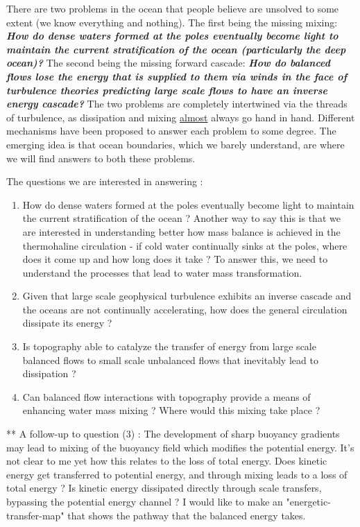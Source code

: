 \documentclass[12pt]{workjournal}
\begin{document}
There are two problems in the ocean that people believe are unsolved to some extent (we know everything and nothing). The first being the missing mixing: \textit{\textbf{How do dense waters formed at the poles eventually become light to maintain the current stratification of the ocean (particularly the deep ocean)?}} The second being the missing forward cascade: \textit{\textbf{How do balanced flows lose the energy that is supplied to them via winds in the face of turbulence theories predicting large scale flows to have an inverse energy cascade?}} The two problems are completely intertwined via the threads of turbulence, as dissipation and mixing \underline{almost} always go hand in hand. Different mechanisms have been proposed to answer each problem to some degree. The emerging idea is that ocean boundaries, which we barely understand, are where we will find answers to both these problems.


The questions we are interested in answering :
\begin{enumerate}
\item How do dense waters formed at the poles eventually become light to maintain the current stratification of the ocean ? Another way to say this is that we are interested in understanding better how mass balance is achieved in the thermohaline circulation - if cold water continually sinks at the poles, where does it come up and how long does it take ? To answer this, we need to understand the processes that lead to water mass transformation.
\item  Given that large scale geophysical turbulence exhibits an inverse cascade and the oceans are not continually accelerating, how does the general circulation dissipate its energy ?
\item Is topography able to catalyze the transfer of energy from large scale balanced flows to small scale unbalanced flows that inevitably lead to dissipation ?
\item Can balanced flow interactions with topography provide a means of enhancing water mass mixing ? Where would this mixing take place ?
\end{enumerate}
** A follow-up to question (3) : The development of sharp buoyancy gradients may lead to mixing of the buoyancy field which modifies the potential energy. It's not clear to me yet how this relates to the loss of total energy. Does kinetic energy get transferred to potential energy, and through mixing leads to a loss of total energy ? Is kinetic energy dissipated directly through scale transfers, bypassing the potential energy channel ? I would like to make an "energetic-transfer-map" that shows the pathway that the balanced energy takes.
\end{document}
